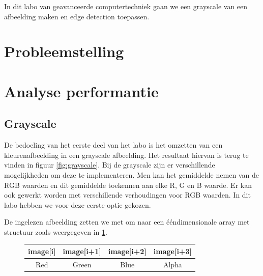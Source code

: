 \documentclass[11pt,twoside,a4paper]{article}
\begin{document}
In dit labo van geavanceerde computertechniek gaan we een grayscale van een afbeelding maken en edge detection toepassen. 

\section{Probleemstelling}




\section{Analyse performantie}

\subsection{Grayscale}

De bedoeling van het eerste deel van het labo is het omzetten van een kleurenafbeelding in een grayscale afbeelding. Het resultaat hiervan is terug te vinden in figuur \ref{fig:grayscale}. Bij de grayscale zijn er verschillende mogelijkheden om deze te implementeren. Men kan het gemiddelde nemen van de RGB waarden en dit gemiddelde toekennen aan elke R, G en B waarde. Er kan ook gewerkt worden met verschillende verhoudingen voor RGB waarden. In dit labo hebben we voor deze eerste optie gekozen.

De ingelezen afbeelding zetten we met  om naar een \'e\'endimensionale array met structuur zoals weergegeven in \ref{fig:1}.



    \begin{figure}[h!]
        \centering

    \begin{tabular}{|c|c|c|c|}
    \hline
    image{[}i{]} & image{[}i+1{]} & image{[}i+2{]} & image{[}i+3{]} \\ \hline
    Red          & Green          & Blue           & Alpha          \\ \hline
    \end{tabular}

        \caption{}
        \label{fig:1}
    \end{figure}
\end{document}
